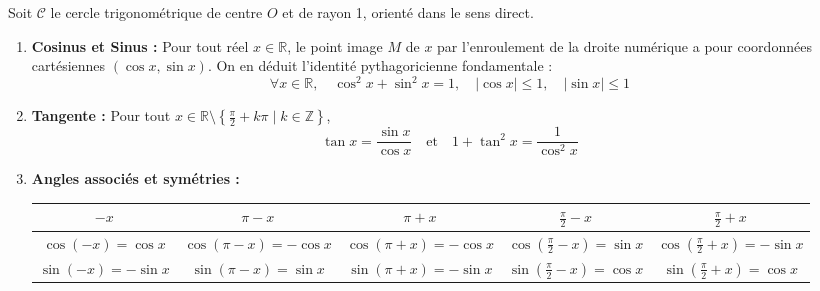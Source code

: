 \documentclass[11pt,a4paper]{article}
\newcommand{\Z}{\mathbb{Z}}
\newcommand{\R}{\mathbb{R}}
\begin{document}
\begin{coursbox}
Soit $\mathcal{C}$ le cercle trigonométrique de centre $O$ et de rayon 1, orienté dans le sens direct.
\begin{enumerate}
    \item \textbf{Cosinus et Sinus :} Pour tout réel $x \in \R$, le point image $M$ de $x$ par l'enroulement de la droite numérique a pour coordonnées cartésiennes $(\cos x, \sin x)$.
    On en déduit l'identité pythagoricienne fondamentale :
    \[
    \forall x \in \R, \quad \cos^2 x + \sin^2 x = 1, \quad |\cos x| \le 1, \quad |\sin x| \le 1
    \]
    \item \textbf{Tangente :} Pour tout $x \in \R \setminus \left\{ \frac{\pi}{2} + k\pi \mid k \in \Z \right\}$,
    \[
    \tan x = \frac{\sin x}{\cos x} \quad \text{et} \quad 1 + \tan^2 x = \frac{1}{\cos^2 x}
    \]
    \item \textbf{Angles associés et symétries :}
    \begin{center}
    \renewcommand{\arraystretch}{1.2}
    \begin{tabular}{|c|c|c|c|c|}
        \hline
        $-x$ & $\pi - x$ & $\pi + x$ & $\frac{\pi}{2} - x$ & $\frac{\pi}{2} + x$ \\
        \hline
        $\cos(-x) = \cos x$ & $\cos(\pi - x) = -\cos x$ & $\cos(\pi + x) = -\cos x$ & $\cos\left(\frac{\pi}{2} - x\right) = \sin x$ & $\cos\left(\frac{\pi}{2} + x\right) = -\sin x$ \\
        \hline
        $\sin(-x) = -\sin x$ & $\sin(\pi - x) = \sin x$ & $\sin(\pi + x) = -\sin x$ & $\sin\left(\frac{\pi}{2} - x\right) = \cos x$ & $\sin\left(\frac{\pi}{2} + x\right) = \cos x$ \\
        \hline
    \end{tabular}
    \end{center}
\end{enumerate}
\end{coursbox}
\end{document}
